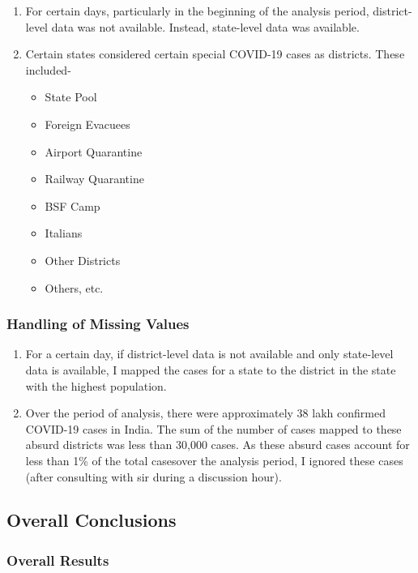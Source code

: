 \documentclass{article}
\begin{document}
\begin{enumerate}
    \item For certain days, particularly in the beginning of the analysis period, district-level data was not available. Instead, state-level data was available.
    \item Certain states considered certain special COVID-19 cases as districts. These included-
    \begin{itemize}
        \item State Pool
        \item Foreign Evacuees
        \item Airport Quarantine
        \item Railway Quarantine
        \item BSF Camp
        \item Italians
        \item Other Districts
        \item Others, etc.
    \end{itemize}
\end{enumerate}

\subsubsection{Handling of Missing Values}

\begin{enumerate}
    \item For a certain day, if district-level data is not available and  only state-level data is available, I mapped the cases for a state to the district in the state with the highest population. 
    \item Over the period of analysis, there were approximately 38 lakh confirmed COVID-19 cases in India. The sum of the number of cases mapped to these absurd districts was less than 30,000 cases. As these absurd cases account for less than 1\% of the total casesover the analysis period, I ignored these cases (after consulting with sir during a discussion hour).
\end{enumerate}

\subsection{Overall Conclusions}

\subsubsection{Overall Results}
\end{document}
